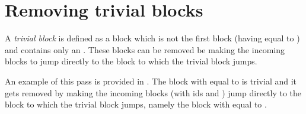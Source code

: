 \section{Removing trivial blocks}

A \textit{trivial block} is defined as a block which is not the first block (having  equal to ) and
contains only an . These blocks can be removed be making the incoming blocks to jump
directly to the block to which the trivial block jumps.

An example of this pass is provided in . The block with  equal to
 is trivial and it gets removed by making the incoming blocks (with ids  and ) jump directly to
the block to which the trivial block jumps, namely the block with  equal to .

